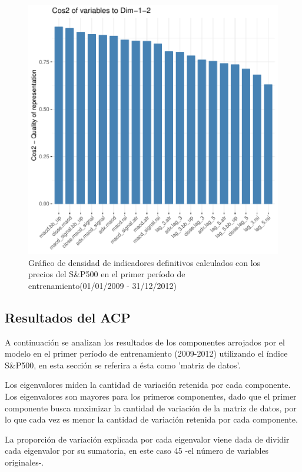 \documentclass[a4paper,12pt]{Latex/Classes/PhDthesisPSnPDF}
\begin{document}
\begin{figure}[H]
\centering
\includegraphics{main-010}
\caption{Gráfico de densidad de indicadores definitivos calculados con los precios del S\&P500 en el primer período de entrenamiento(01/01/2009 - 31/12/2012)}
\end{figure}

\subsection{Resultados del ACP}

A continuación se analizan los resultados de los componentes arrojados por el modelo en el primer período de entrenamiento (2009-2012) utilizando el índice S\&P500, en esta sección se referira a ésta como 'matriz de datos'.


Los eigenvalores miden la cantidad de variación retenida por cada componente. Los eigenvalores son mayores para los primeros componentes, dado que el primer componente busca maximizar la cantidad de variación de la matriz de datos, por lo que cada vez es menor la cantidad de variación retenida por cada componente.

La proporción de variación explicada por cada eigenvalor viene dada de dividir cada eigenvalor por su sumatoria, en este caso 45 -el número de variables originales-.
\end{document}
